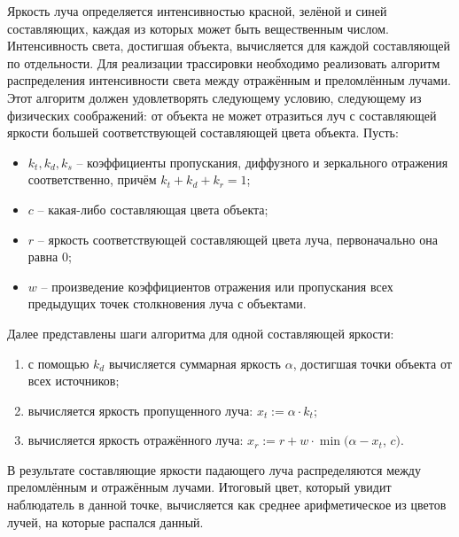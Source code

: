{    Яркость луча определяется интенсивностью красной, зелёной и синей составляющих,
    каждая из которых может быть вещественным числом.
    Интенсивность света, достигшая объекта, вычисляется для каждой составляющей
    по отдельности.
    Для реализации трассировки необходимо реализовать алгоритм распределения
    интенсивности света между отражённым и преломлённым лучами.
    Этот алгоритм должен удовлетворять следующему условию, следующему
    из физических соображений: от объекта не может отразиться луч с составляющей
    яркости большей соответствующей составляющей цвета объекта.
    Пусть:
    \begin{itemize}
        \item
            $k_t, k_d, k_s$ -- коэффициенты пропускания,
            диффузного и зеркального отражения соответственно,
            причём $k_t + k_d + k_r = 1$;
        \item $c$ -- какая-либо составляющая цвета объекта;
        \item
            $r$ -- яркость соответствующей составляющей цвета луча,
            первоначально она равна $0$;
        \item
            $w$ -- произведение коэффициентов отражения или пропускания
            всех предыдущих точек столкновения луча с объектами.
    \end{itemize}
    Далее представлены шаги алгоритма для одной составляющей яркости:
    \begin{enumerate}
        \item
            с помощью $k_d$ вычисляется суммарная яркость $\alpha$,
            достигшая точки объекта от всех источников;
        \item вычисляется яркость пропущенного луча: $x_t := \alpha \cdot k_t$;
        \item
            вычисляется яркость отражённого луча:
            $x_r := r + w \cdot \operatorname{min}(\alpha - x_t$, $c)$.
    \end{enumerate}
    В результате составляющие яркости падающего луча распределяются
    между преломлённым и отражённым лучами.
    Итоговый цвет, который увидит наблюдатель в данной точке, вычисляется
    как среднее арифметическое из цветов лучей, на которые распался данный.
}